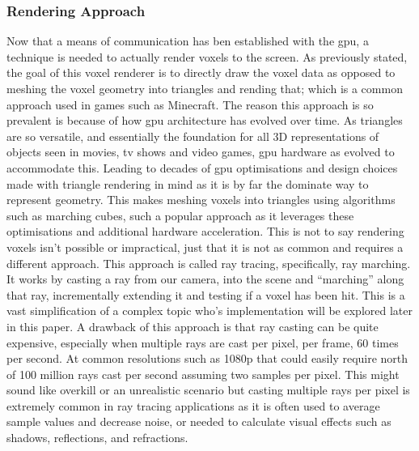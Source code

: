 \documentclass[titlepage]{article}
\begin{document}
\subsubsection{Rendering Approach}
Now that a means of communication has ben established with the \gls{gpu}, a technique is needed to actually render voxels to the screen. As previously stated, the goal of this voxel renderer is to directly draw the voxel data as opposed to meshing the voxel geometry into triangles and rending that; which is a common approach used in games such as Minecraft. The reason this approach is so prevalent is because of how \gls{gpu} architecture has evolved over time. As triangles are so versatile, and essentially the foundation for all 3D representations of objects seen in movies, tv shows and video games, \gls{gpu} hardware as evolved to accommodate this. Leading to decades of \gls{gpu} optimisations and design choices made with triangle rendering in mind as it is by far the dominate way to represent geometry. This makes meshing voxels into triangles using algorithms such as marching cubes, such a popular approach as it leverages these optimisations and additional hardware acceleration. This is not to say rendering voxels isn't possible or impractical, just that it is not as common and requires a different approach. This approach is called ray tracing, specifically, ray marching. It works by casting a ray from our camera, into the scene and ``marching'' along that ray, incrementally extending it and testing if a voxel has been hit. This is a vast simplification of a complex topic who's implementation will be explored later in this paper. A drawback of this approach is that ray casting can be quite expensive, especially when multiple rays are cast per pixel, per frame, 60 times per second. At common resolutions such as 1080p that could easily require north of 100 million rays cast per second assuming two samples per pixel. This might sound like overkill or an unrealistic scenario but casting multiple rays per pixel is extremely common in ray tracing applications as it is often used to average sample values and decrease noise, or needed to calculate visual effects such as shadows, reflections, and refractions.
\end{document}
